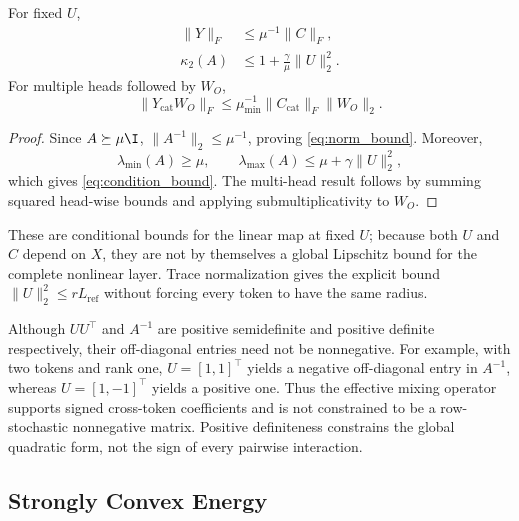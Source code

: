 \begin{proposition}
\label{prop:bounds}
For fixed $U$,
\begin{align}
  \lVert Y\rVert_F&\leq\mu^{-1}\lVert C\rVert_F,\label{eq:norm_bound}\\
  \kappa_2(A)&\leq1+\frac{\gamma}{\mu}\lVert U\rVert_2^2.
  \label{eq:condition_bound}
\end{align}
For multiple heads followed by $W_O$,
\begin{equation}
  \lVert Y_{\mathrm{cat}}W_O\rVert_F
  \leq\mu_{\min}^{-1}
  \lVert C_{\mathrm{cat}}\rVert_F\lVert W_O\rVert_2.
\end{equation}
\end{proposition}
\begin{proof}
Since $A\succeq\mu\I$, $\lVert A^{-1}\rVert_2\leq\mu^{-1}$, proving \cref{eq:norm_bound}. Moreover,
\[
  \lambda_{\min}(A)\geq\mu,
  \qquad
  \lambda_{\max}(A)\leq\mu+\gamma\lVert U\rVert_2^2,
\]
which gives \cref{eq:condition_bound}. The multi-head result follows by summing squared head-wise bounds and applying submultiplicativity to $W_O$.
\end{proof}

These are conditional bounds for the linear map at fixed $U$; because both $U$ and $C$ depend on $X$, they are not by themselves a global Lipschitz bound for the complete nonlinear layer. Trace normalization gives the explicit bound $\lVert U\rVert_2^2\leq rL_{\mathrm{ref}}$ without forcing every token to have the same radius.

Although $UU^\top$ and $A^{-1}$ are positive semidefinite and positive definite respectively, their off-diagonal entries need not be nonnegative. For example, with two tokens and rank one, $U=[1,1]^\top$ yields a negative off-diagonal entry in $A^{-1}$, whereas $U=[1,-1]^\top$ yields a positive one. Thus the effective mixing operator supports signed cross-token coefficients and is not constrained to be a row-stochastic nonnegative matrix. Positive definiteness constrains the global quadratic form, not the sign of every pairwise interaction.

\subsection{Strongly Convex Energy}


